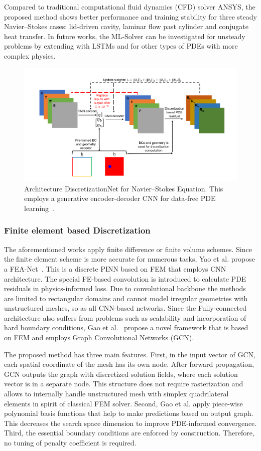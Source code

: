 Compared to traditional computational fluid dynamics (CFD) solver ANSYS, the proposed method shows better performance and training stability for three steady Navier--Stokes cases: lid-driven cavity, laminar flow past cylinder and conjugate heat transfer. In future works, the ML-Solver can be investigated for unsteady problems by extending with LSTMs and for other types of PDEs with more complex physics.

\begin{figure}
	\centering
	\includegraphics[width=12cm]{figures/discretizationnet.png}
	\caption{Architecture DiscretizationNet for Navier--Stokes Equation. This employs a generative encoder-decoder CNN for data-free PDE learning~\cite{Ranade20}.}
	\label{fig:discretizationnet}
\end{figure}  

\subsubsection{Finite element based Discretization}

The aforementioned works apply finite difference or finite volume schemes. Since the finite element scheme is more accurate for numerous tasks, Yao et al. propose a FEA-Net~\cite{feanet}. This is a discrete PINN based on FEM that employs CNN architecture. The special FE-based convolution is introduced to calculate PDE residuals in physics-informed loss. Due to convolutional backbone the methods are limited to rectangular domains and cannot model irregular geometries with unstructured meshes, so as all CNN-based networks. Since the Fully-connected architecture also suffers from problems such as scalability and incorporation of hard boundary conditions, Gao et al.~\cite{Gao21} propose a novel framework that is based on FEM and employs Graph Convolutional Networks (GCN).

The proposed method has three main features. First, in the input vector of GCN, each spatial coordinate of the mesh has its own node. After forward propagation, GCN outputs the graph with discretized solution fields, where each solution vector is in a separate node. This structure does not require rasterization and allows to internally handle unstructured mesh with simplex quadrilateral elements in spirit of classical FEM solver. Second, Gao et al. apply piece-wise polynomial basis functions that help to make predictions based on output graph. This decreases the search space dimension to improve PDE-informed convergence. Third, the essential boundary conditions are enforced by construction. Therefore, no tuning of penalty coefficient is required. 


